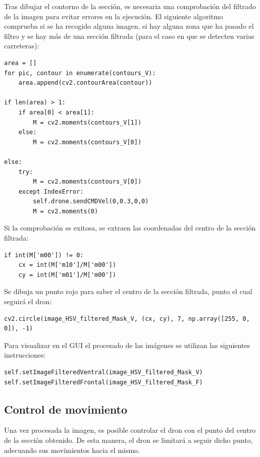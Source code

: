 Tras dibujar el contorno de la sección, es necesaria una comprobación del filtrado de la imagen para evitar errores en la ejecución. El siguiente algoritmo comprueba si se ha recogido alguna imagen, si hay alguna zona que ha pasado el filtro y se hay más de una sección filtrada (para el caso en que se detecten varias carreteras):

\lstset{language=Python, breaklines=true, basicstyle=\footnotesize}
\begin{lstlisting}[frame=single]
area = []
for pic, contour in enumerate(contours_V):
    area.append(cv2.contourArea(contour))

if len(area) > 1:
    if area[0] < area[1]:
        M = cv2.moments(contours_V[1])
    else:
        M = cv2.moments(contours_V[0])

else:
    try:
        M = cv2.moments(contours_V[0])
    except IndexError:
        self.drone.sendCMDVel(0,0.3,0,0)
        M = cv2.moments(0)
\end{lstlisting}

Si la comprobación es exitosa, se extraen las coordenadas del centro de la sección filtrada:

\lstset{language=Python, breaklines=true, basicstyle=\footnotesize}
\begin{lstlisting}[frame=single]
if int(M['m00']) != 0:
    cx = int(M['m10']/M['m00'])
    cy = int(M['m01']/M['m00'])
\end{lstlisting}

Se dibuja un punto rojo para saber el centro de la sección filtrada, punto el cual seguirá el dron:

\lstset{language=Python, breaklines=true, basicstyle=\footnotesize}
\begin{lstlisting}[frame=single]
cv2.circle(image_HSV_filtered_Mask_V, (cx, cy), 7, np.array([255, 0, 0]), -1)
\end{lstlisting}

Para visualizar en el GUI el procesado de las imágenes se utilizan las siguientes instrucciones:

\lstset{language=Python, breaklines=true, basicstyle=\footnotesize}
\begin{lstlisting}[frame=single]
self.setImageFilteredVentral(image_HSV_filtered_Mask_V)
self.setImageFilteredFrontal(image_HSV_filtered_Mask_F)
\end{lstlisting}

\subsection{Control de movimiento}
Una vez procesada la imagen, es posible controlar el dron con el punto del centro de la sección obtenido. De esta manera, el dron se limitará a seguir dicho punto, adecuando sus movimientos hacia el mismo.

